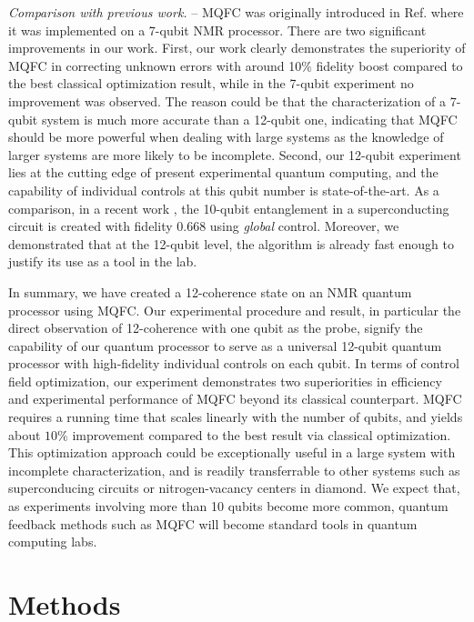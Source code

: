 \documentclass[twocolumn,reprint, amsmath,amssymb,showpacs,superscriptaddress]{revtex4-1}
\begin{document}
\emph{Comparison with previous work.} -- MQFC was originally introduced in Ref. \cite{li2016physical} where it was implemented on a   7-qubit NMR processor.  There are two significant improvements in our work. First, our work clearly demonstrates the superiority of MQFC in correcting unknown errors with around 10\% fidelity boost compared to the best classical optimization result, while in the 7-qubit experiment no improvement was observed. The reason could be that the characterization of a 7-qubit system is much more accurate than a 12-qubit one, indicating that MQFC should be more powerful when dealing with large systems as the knowledge of larger systems are more likely to be incomplete. Second, our 12-qubit experiment lies at the cutting edge of  present experimental quantum computing, and the capability of individual controls at this qubit number is state-of-the-art. As a comparison, in a recent work \cite{song201710}, the 10-qubit entanglement in a superconducting circuit is created with fidelity 0.668 using \emph{global} control. Moreover, we demonstrated that at the 12-qubit level, the algorithm is already fast enough to justify its use as a tool in the lab.

In summary, we have created a 12-coherence state on an NMR quantum processor using MQFC. Our experimental procedure and result, in particular the direct observation of 12-coherence with one qubit as the probe, signify the capability of our quantum processor to serve as a universal 12-qubit quantum processor with high-fidelity individual controls on each qubit. In terms of control field optimization, our experiment demonstrates two superiorities in efficiency and experimental performance of MQFC beyond its classical counterpart. MQFC requires a running time that scales linearly with the number of qubits, and yields about $10\%$ improvement compared to the best result via classical optimization. This optimization approach could be exceptionally useful in a large system with incomplete characterization, and is readily transferrable to other systems such as superconducing circuits or nitrogen-vacancy centers in diamond. We expect that, as experiments involving more than 10 qubits become more common, quantum feedback methods such as MQFC will become standard tools in quantum computing labs.

\section{Methods}
\end{document}
